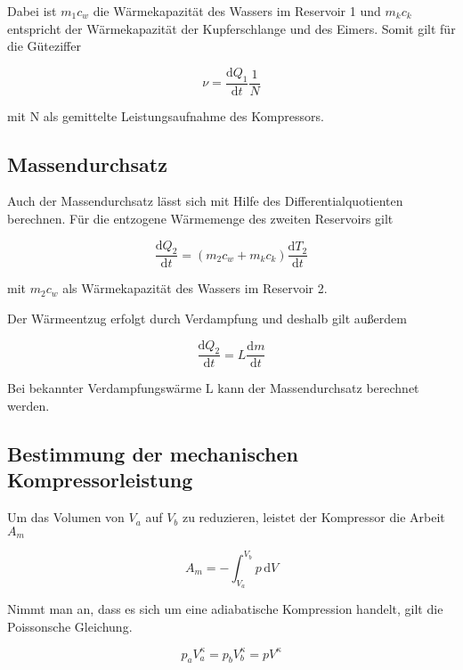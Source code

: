 Dabei ist $m_{1} c_w$ die Wärmekapazität des Wassers im Reservoir 1 und $m_k c_k$ entspricht der Wärmekapazität der Kupferschlange und des Eimers. Somit gilt für die Güteziffer

\begin{equation}
\label{eqn:güteziffer2}
ν = \frac{\mathrm{d}Q_{1}}{\mathrm{d}t} \frac{1}{N}
\end{equation}

mit N als gemittelte Leistungsaufnahme des Kompressors.

\subsection{Massendurchsatz}
Auch der Massendurchsatz lässt sich mit Hilfe des Differentialquotienten berechnen. Für die entzogene Wärmemenge des zweiten Reservoirs gilt

\begin{equation}
\label{eqn:durchsatz1}
\frac{\mathrm{d}Q_{2}}{\mathrm{d}t} = (m_2 c_w + m_kc_k)\frac{\mathrm{d}T_{2}}{\mathrm{d}t}
\end{equation}

mit $m_{2} c_w$ als Wärmekapazität des Wassers im Reservoir 2.

Der Wärmeentzug erfolgt durch Verdampfung und deshalb gilt außerdem

\begin{equation}
\label{eqn:durchsatz2}
\frac{\mathrm{d}Q_{2}}{\mathrm{d}t} = L\frac{\mathrm{d}m}{\mathrm{d}t}
\end{equation}

Bei bekannter Verdampfungswärme L kann der Massendurchsatz berechnet werden.

\subsection{Bestimmung der mechanischen Kompressorleistung}
Um das Volumen von $V_a$ auf $V_b$ zu reduzieren, leistet der Kompressor die Arbeit $A_m$

\begin{equation}
A_m = - \int_{V_a}^{V_b} p \, \mathrm{d}V
\end{equation}

Nimmt man an, dass es sich um eine adiabatische Kompression handelt, gilt die Poissonsche Gleichung.

\begin{equation}
p_a V_a^{\kappa} = p_b V_b^{\kappa} = pV^{\kappa}
\end{equation}


